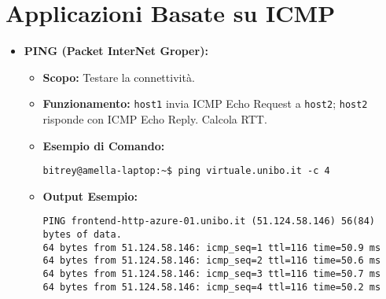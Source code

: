 \section{Applicazioni Basate su ICMP}
\begin{itemize}
    \item \textbf{PING (Packet InterNet Groper):}
    \begin{itemize}
        \item \textbf{Scopo:} Testare la connettività.
        \item \textbf{Funzionamento:} \texttt{host1} invia ICMP Echo Request a \texttt{host2}; \texttt{host2} risponde con ICMP Echo Reply. Calcola RTT.
        \item \textbf{Esempio di Comando:}
\begin{verbatim}
bitrey@amella-laptop:~$ ping virtuale.unibo.it -c 4
\end{verbatim}
        \item \textbf{Output Esempio:}
\begin{verbatim}
PING frontend-http-azure-01.unibo.it (51.124.58.146) 56(84) bytes of data.
64 bytes from 51.124.58.146: icmp_seq=1 ttl=116 time=50.9 ms
64 bytes from 51.124.58.146: icmp_seq=2 ttl=116 time=50.6 ms
64 bytes from 51.124.58.146: icmp_seq=3 ttl=116 time=50.7 ms
64 bytes from 51.124.58.146: icmp_seq=4 ttl=116 time=50.2 ms


\end{verbatim}
\end{itemize}
\end{itemize}
